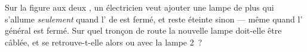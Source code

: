 \begin{exercise}[$\star\star$]\label{exo:g5:series-parallel-circuits:11}
Sur la figure aux deux , un électricien veut ajouter une
lampe de plus qui s'allume \emph{seulement} quand l' de
 est fermé, et reste éteinte sinon --- même quand
l' général est fermé. Sur quel tronçon de route la
nouvelle lampe doit-elle être câblée, et se retrouve-t-elle alors  ou  avec la lampe 2~?
\end{exercise}
